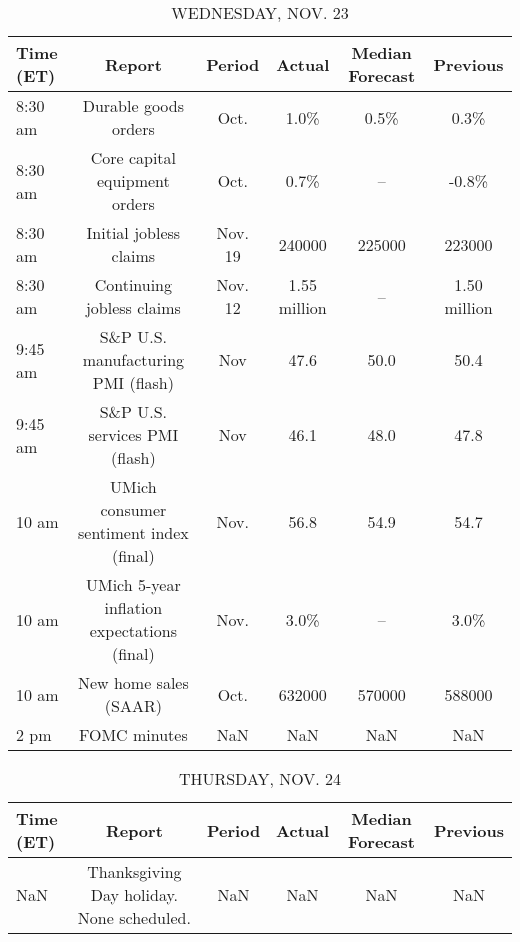 \documentclass{article}%
\begin{document}
\begin{table}[htbp]%
\caption{WEDNESDAY, NOV. 23}%
\centering%
\begin{adjustbox}{width=1\textwidth}%
\begin{tabular}{lccccc}
\toprule
Time (ET) &                                      Report &  Period &       Actual & Median Forecast &     Previous \\
\midrule
  8:30 am &                        Durable goods orders &    Oct. &         1.0\% &            0.5\% &         0.3\% \\
  8:30 am &               Core capital equipment orders &    Oct. &         0.7\% &              -- &        -0.8\% \\
  8:30 am &                      Initial jobless claims & Nov. 19 &       240000 &          225000 &       223000 \\
  8:30 am &                   Continuing jobless claims & Nov. 12 & 1.55 million &              -- & 1.50 million \\
  9:45 am &          S\&P U.S. manufacturing PMI (flash) &     Nov &         47.6 &            50.0 &         50.4 \\
  9:45 am &               S\&P U.S. services PMI (flash) &     Nov &         46.1 &            48.0 &         47.8 \\
    10 am &      UMich consumer sentiment index (final) &    Nov. &         56.8 &            54.9 &         54.7 \\
    10 am & UMich 5-year inflation expectations (final) &    Nov. &         3.0\% &              -- &         3.0\% \\
    10 am &                       New home sales (SAAR) &    Oct. &       632000 &          570000 &       588000 \\
     2 pm &                                FOMC minutes &     NaN &          NaN &             NaN &          NaN \\
\bottomrule
\end{tabular}
%
\end{adjustbox}%
\end{table}

%


\begin{table}[htbp]%
\caption{THURSDAY, NOV. 24}%
\centering%
\begin{adjustbox}{width=1\textwidth}%
\begin{tabular}{lccccc}
\toprule
Time (ET) &                                    Report & Period & Actual & Median Forecast & Previous \\
\midrule
      NaN & Thanksgiving Day holiday. None scheduled. &    NaN &    NaN &             NaN &      NaN \\
\bottomrule
\end{tabular}
%
\end{adjustbox}%
\end{table}
\end{document}
